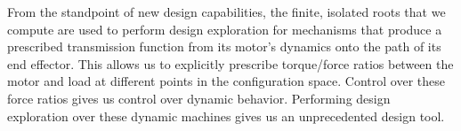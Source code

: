 \documentclass[journal]{IEEEtran}
\begin{document}
From the standpoint of new design capabilities, the finite, isolated roots that we compute are used to perform design exploration for mechanisms that produce a prescribed transmission function from its motor's dynamics onto the path of its end effector.
This allows us to explicitly prescribe torque/force ratios between the motor and load at different points in the configuration space.
Control over these force ratios gives us control over dynamic behavior.  
Performing design exploration over these dynamic machines gives us an unprecedented design tool.



\end{document}
